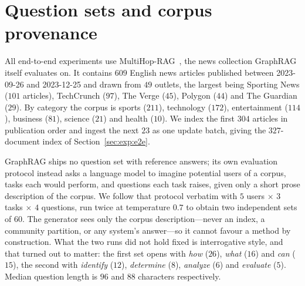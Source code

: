 \section{Question sets and corpus provenance}
\label{app:questions}

 All end-to-end experiments use MultiHop-RAG~\cite{tang2024multihoprag},
the news collection GraphRAG itself evaluates on. It contains $609$ English news
articles published between 2023-09-26 and 2023-12-25 and drawn from $49$ outlets,
the largest being Sporting News ($101$ articles), TechCrunch ($97$), The Verge
($45$), Polygon ($44$) and The Guardian ($29$). By category the corpus is
sports ($211$), technology ($172$), entertainment ($114$), business ($81$), science ($21$) and health ($10$).
We index the first $304$ articles in publication order and ingest the next $23$
as one update batch, giving the $327$-document index of Section~\ref{sec:exp:e2e}.

 GraphRAG ships no question set with reference
answers; its own evaluation protocol instead asks a language model to imagine
potential users of a corpus, tasks each would perform, and questions each task
raises, given only a short prose description of the corpus. We follow that
protocol verbatim with $5$ users $\times$ $3$ tasks $\times$ $4$ questions, run
twice at temperature $0.7$ to obtain two independent sets of $60$. The generator
sees only the corpus description---never an index, a community partition, or any
system's answer---so it cannot favour a method by construction. What the two runs
did not hold fixed is interrogative style, and that turned out to matter: the
first set opens with \emph{how} ($26$), \emph{what} ($16$) and \emph{can} ($15$),
the second with \emph{identify} ($12$), \emph{determine} ($8$), \emph{analyze}
($6$) and \emph{evaluate} ($5$). Median question length is $96$ and $88$
characters respectively.

